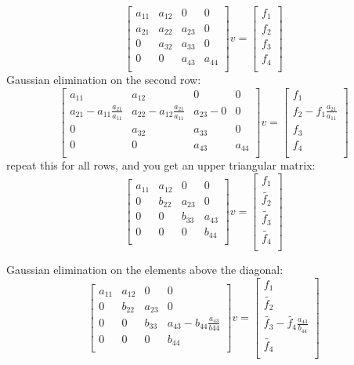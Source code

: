 \documentclass{article}
\begin{document}
$$
\begin{bmatrix}
a_{11} & a_{12} & 0 & 0 \\
a_{21} & a_{22} & a_{23} & 0 \\
0 & a_{32} & a_{33} & 0 \\
0 & 0 & a_{43} & a_{44} \\
\end{bmatrix}
v=
\begin{bmatrix}
f_1\\
f_2\\
f_3\\
f_4\\
\end{bmatrix}
$$
Gaussian elimination on the second row:
$$
\begin{bmatrix}
a_{11} & a_{12} & 0 & 0 \\
a_{21}-a_{11}\frac{a_{21}}{a_{11}} & a_{22} -a_{12}\frac{a_{21}}{a_{11}} & a_{23}-0 & 0 \\
0 & a_{32} & a_{33} & 0 \\
0 & 0 & a_{43} & a_{44} \\
\end{bmatrix}
v=
\begin{bmatrix}
f_1\\
f_2-f_1\frac{a_{21}}{a_{11}}\\
f_3\\
f_4\\
\end{bmatrix}
$$
repeat this for all rows, and you get an upper triangular matrix:
$$
\begin{bmatrix}
a_{11} & a_{12} & 0 & 0 \\
0 & b_{22} & a_{23} & 0 \\
0 & 0 & b_{33} & a_{43} \\
0 & 0 & 0 & b_{44} \\
\end{bmatrix}
v=
\begin{bmatrix}
f_1\\
\tilde{f_2}\\
\tilde{f_3}\\
\tilde{f_4}\\
\end{bmatrix}
$$

Gaussian elimination on the elements above the diagonal:
$$
\begin{bmatrix}
a_{11} & a_{12} & 0 & 0 \\
0 & b_{22} & a_{23} & 0 \\
0 & 0 & b_{33} & a_{43}-b_{44}\frac{a_{43}}{b{44}} \\
0 & 0 & 0 & b_{44} \\
\end{bmatrix}
v=
\begin{bmatrix}
f_1\\
\tilde{f_2}\\
\tilde{f_3}-\tilde{f_4}\frac{a_{43}}{b_{44}}\\
\tilde{f_4}\\
\end{bmatrix}
$$
\end{document}
